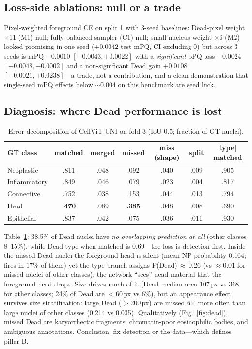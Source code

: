 \documentclass[11pt]{article}
\begin{document}
\subsection{Loss-side ablations: null or a trade}
Pixel-weighted foreground CE on split 1 with 3-seed baselines: Dead-pixel weight $\times$11 (M1)
null; fully balanced sampler (C1) null; small-nucleus weight $\times$6 (M2) looked promising in
one seed ($+0.0042$ test mPQ, CI excluding 0) but across 3 seeds is mPQ $-0.0010$
$[-0.0043,+0.0022]$ with a \emph{significant} bPQ loss $-0.0024$ $[-0.0048,-0.0002]$ and a
non-significant Dead gain $+0.0108$ $[-0.0021,+0.0238]$---a trade, not a contribution, and a
clean demonstration that single-seed mPQ effects below $\sim$0.004 on this benchmark are seed
luck.

\subsection{Diagnosis: where Dead performance is lost}
\label{sec:diagnosis}

\begin{table}[t]
\centering\small
\caption{Error decomposition of CellViT-UNI on fold 3 (IoU 0.5; fraction of GT nuclei).}
\label{tab:decomp}
\begin{tabular}{lcccccc}
\toprule
GT class & matched & merged & missed & miss (shape) & split & type$\mid$matched \\
\midrule
Neoplastic   & .811 & .048 & .092 & .040 & .009 & .905 \\
Inflammatory & .849 & .046 & .079 & .023 & .004 & .817 \\
Connective   & .752 & .038 & .153 & .044 & .013 & .794 \\
Dead         & \textbf{.470} & .089 & \textbf{.385} & .048 & .008 & .690 \\
Epithelial   & .837 & .042 & .075 & .036 & .011 & .930 \\
\bottomrule
\end{tabular}
\end{table}

Table~\ref{tab:decomp}: 38.5\% of Dead nuclei have \emph{no overlapping prediction at all}
(other classes 8--15\%), while Dead type-when-matched is 0.69---the loss is detection-first.
Inside the missed Dead nuclei the foreground head is silent (mean NP probability 0.164; fires in
17\% of them) yet the type branch assigns P(Dead)\,$\approx$\,0.26 (vs $\approx$0.01 for missed
nuclei of other classes): the network ``sees'' dead material that the foreground head drops.
Size drives much of it (Dead median area 107\,px vs 368 for other classes; 24\% of Dead are
$<$60\,px vs 6\%), but an appearance effect survives size stratification: large Dead
($>$200\,px) are missed 6$\times$ more often than large nuclei of other classes (0.214 vs
0.035). Qualitatively (Fig.~\ref{fig:dead}), missed Dead are karyorrhectic fragments,
chromatin-poor eosinophilic bodies, and ambiguous annotations. Conclusion: fix detection or the
data---which defines pillar B.
\end{document}
